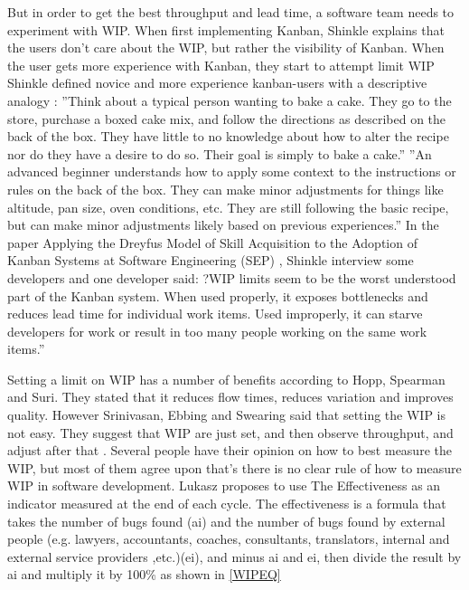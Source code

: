 \documentclass[UKenglish]{ifimaster}  %
\begin{document}
But in order to get the best throughput and lead time, a software team needs to experiment with WIP. 
When first implementing Kanban, Shinkle explains that the users don't care about the WIP, but rather the visibility of Kanban. When the user gets more experience with Kanban, they start to attempt limit WIP \parencite{Shinkle}
Shinkle defined novice and more experience kanban-users with a descriptive analogy \parencite{Shinkle}:
''Think about a typical person wanting to bake a cake. They go to the store, purchase a boxed cake mix, and follow the directions as described on the back of the box. They have little to no knowledge about how to alter the recipe nor do they have a desire to do so. Their goal is simply to bake a cake.''
''An advanced beginner understands how to apply some context to the instructions or rules on the back of the box. They can make minor adjustments for things like altitude, pan size, oven conditions, etc. They are still following the basic recipe, but can make minor adjustments likely based on previous experiences.''
In the paper Applying the Dreyfus Model of Skill Acquisition to the Adoption of Kanban Systems at Software Engineering (SEP) \parencite{Shinkle}, Shinkle interview some developers and one developer said:
?WIP limits seem to be the worst understood part of the Kanban system. When used properly, it exposes bottlenecks and reduces lead time for individual work items. Used improperly, it can starve developers for work or result in too many people working on the same work items.'' \parencite{Shinkle}
 
Setting a limit on WIP has a number of benefits according to Hopp, Spearman and Suri. They stated that it reduces flow times, reduces variation and improves quality. However Srinivasan, Ebbing and Swearing said that setting the WIP is not easy. They suggest that WIP are just set, and then observe throughput, and adjust after that \parencite{Mandyam}.
Several people have their opinion on how to best measure the WIP, but most of them agree upon that's there is no clear rule of how to measure WIP in software development. Lukasz proposes to use The Effectiveness as an indicator measured at the end of each cycle. The effectiveness is a formula that takes the number of bugs found (ai) and the number of bugs found by external people (e.g. lawyers, accountants, coaches, consultants, translators, internal and external service providers ,etc.)(ei), and minus ai and ei, then divide the result by ai and multiply it by 100\%  as shown in \ref{WIPEQ} \parencite{Sienkiewicz}
\end{document}
